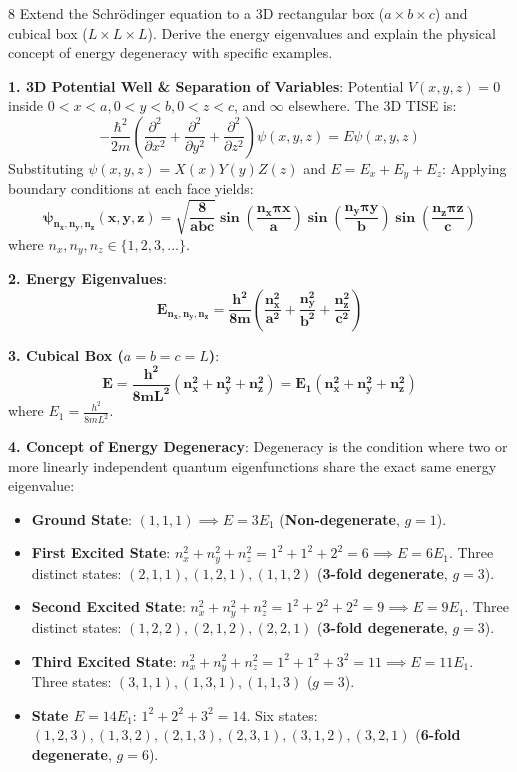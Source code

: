 \vspace{4mm}

\begin{theoryq}{8}
Extend the Schrödinger equation to a 3D rectangular box ($a \times b \times c$) and cubical box ($L \times L \times L$). Derive the energy eigenvalues and explain the physical concept of energy degeneracy with specific examples.
\end{theoryq}
\begin{theorysol}
\textbf{1. 3D Potential Well \& Separation of Variables}:
Potential $V(x,y,z) = 0$ inside $0 < x < a, 0 < y < b, 0 < z < c$, and $\infty$ elsewhere.
The 3D TISE is:
\begin{equation}
-\frac{\hbar^2}{2m}\left(\frac{\partial^2}{\partial x^2} + \frac{\partial^2}{\partial y^2} + \frac{\partial^2}{\partial z^2}\right)\psi(x,y,z) = E\psi(x,y,z)
\end{equation}
Substituting $\psi(x,y,z) = X(x)Y(y)Z(z)$ and $E = E_x + E_y + E_z$:
Applying boundary conditions at each face yields:
\begin{equation}
\mathbf{\psi_{n_x,n_y,n_z}(x,y,z) = \sqrt{\frac{8}{a b c}}\sin\left(\frac{n_x\pi x}{a}\right)\sin\left(\frac{n_y\pi y}{b}\right)\sin\left(\frac{n_z\pi z}{c}\right)}
\end{equation}
where $n_x, n_y, n_z \in \{1, 2, 3,\dots\}$.

\textbf{2. Energy Eigenvalues}:
\begin{equation}
\mathbf{E_{n_x,n_y,n_z} = \frac{h^2}{8m}\left( \frac{n_x^2}{a^2} + \frac{n_y^2}{b^2} + \frac{n_z^2}{c^2} \right)}
\end{equation}

\textbf{3. Cubical Box ($a = b = c = L$)}:
\begin{equation}
\mathbf{E = \frac{h^2}{8mL^2}(n_x^2 + n_y^2 + n_z^2) = E_1(n_x^2 + n_y^2 + n_z^2)}
\end{equation}
where $E_1 = \frac{h^2}{8mL^2}$.

\textbf{4. Concept of Energy Degeneracy}:
Degeneracy is the condition where two or more linearly independent quantum eigenfunctions share the exact same energy eigenvalue:
\begin{itemize}
    \item \textbf{Ground State}: $(1,1,1) \implies E = 3E_1$ (\textbf{Non-degenerate}, $g=1$).
    \item \textbf{First Excited State}: $n_x^2+n_y^2+n_z^2 = 1^2+1^2+2^2 = 6 \implies E = 6E_1$.
    Three distinct states: $(2,1,1), (1,2,1), (1,1,2)$ (\textbf{3-fold degenerate}, $g=3$).
    \item \textbf{Second Excited State}: $n_x^2+n_y^2+n_z^2 = 1^2+2^2+2^2 = 9 \implies E = 9E_1$.
    Three distinct states: $(1,2,2), (2,1,2), (2,2,1)$ (\textbf{3-fold degenerate}, $g=3$).
    \item \textbf{Third Excited State}: $n_x^2+n_y^2+n_z^2 = 1^2+1^2+3^2 = 11 \implies E = 11E_1$.
    Three states: $(3,1,1), (1,3,1), (1,1,3)$ ($g=3$).
    \item \textbf{State $E = 14E_1$}: $1^2+2^2+3^2 = 14$.
    Six states: $(1,2,3), (1,3,2), (2,1,3), (2,3,1), (3,1,2), (3,2,1)$ (\textbf{6-fold degenerate}, $g=6$).
\end{itemize}
\end{theorysol}
